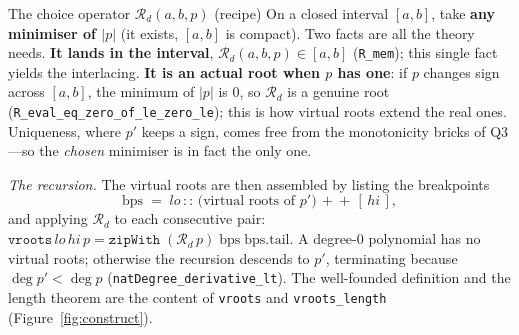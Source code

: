 \documentclass[11pt]{article}
\newcommand{\lean}[1]{\texttt{#1}}
\newcommand{\Rd}{\mathcal{R}}
\begin{document}
\begin{recipebox}{The choice operator $\Rd_d(a,b,p)$ (recipe)}
On a closed interval $[a,b]$, take \textbf{any minimiser of $|p|$} (it exists, $[a,b]$ is compact).
Two facts are all the theory needs. \textbf{It lands in the interval}, $\Rd_d(a,b,p)\in[a,b]$
(\lean{R\_mem}); this single fact yields the interlacing. \textbf{It is an actual root when $p$ has
one}: if $p$ changes sign across $[a,b]$, the minimum of $|p|$ is $0$, so $\Rd_d$ is a genuine root
(\lean{R\_eval\_eq\_zero\_of\_le\_zero\_le}); this is how virtual roots extend the real ones.
Uniqueness, where $p'$ keeps a sign, comes free from the monotonicity bricks of Q3---so the
\emph{chosen} minimiser is in fact the only one.
\end{recipebox}

\emph{The recursion.} The virtual roots are then assembled by listing the breakpoints
\[
  \mathrm{bps} \;=\; lo \,::\, \big(\text{virtual roots of }p'\big) \,+\!\!+\, [\,hi\,],
\]
and applying $\Rd_d$ to each consecutive pair:
$\lean{vroots}\,lo\,hi\,p = \lean{zipWith}\;(\Rd_d\,p)\;\mathrm{bps}\;\mathrm{bps.tail}$. A degree-$0$
polynomial has no virtual roots; otherwise the recursion descends to $p'$, terminating because
$\deg p' < \deg p$ (\lean{natDegree\_derivative\_lt}). The well-founded definition and the length
theorem are the content of \lean{vroots} and \lean{vroots\_length}
(Figure~\ref{fig:construct}).
\end{document}
